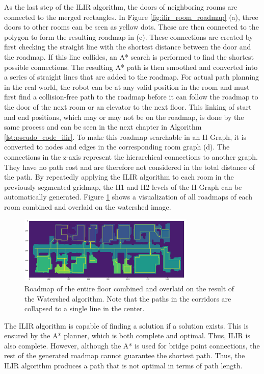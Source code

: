 As the last step of the ILIR algorithm, the doors of neighboring rooms are connected to the merged rectangles. In Figure \ref{fig:ilir_room_roadmap} (a), three doors to other rooms can be seen as yellow dots. These are then connected to the polygon to form the resulting roadmap in (c). These connections are created by first checking the straight line with the shortest distance between the door and the roadmap. If this line collides, an A* search is performed to find the shortest possible connections. The resulting A* path is then smoothed and converted into a series of straight lines that are added to the roadmap. For actual path planning in the real world, the robot can be at any valid position in the room and must first find a collision-free path to the roadmap before it can follow the roadmap to the door of the next room or an elevator to the next floor. This linking of start and end positions, which may or may not be on the roadmap, is done by the same process and can be seen in the next chapter in Algorithm \ref{lst:pseudo_code_ilir}. To make this roadmap searchable in an H-Graph, it is converted to nodes and edges in the corresponding room graph (d). The connections in the z-axis represent the hierarchical connections to another graph. They have no path cost and are therefore not considered in the total distance of the path. By repeatedly applying the ILIR algorithm to each room in the previously segmented gridmap, the H1 and H2 levels of the H-Graph can be automatically generated. Figure \ref{fig:ryu_roadmap} shows a visualization of all roadmaps of each room combined and overlaid on the watershed image.

\begin{figure}[h]
    \centering
    \includegraphics[width=0.75\textwidth]{figures/50_implementation/ryu_roadmap.png}
    \caption[Roadmap of the entire floor combined]{Roadmap of the entire floor combined and overlaid on the result of the Watershed algorithm. Note that the paths in the corridors are collapsed to a single line in the center.}
    \label{fig:ryu_roadmap}
\end{figure}

The ILIR algorithm is capable of finding a solution if a solution exists. This is ensured by the A* planner, which is both complete and optimal. Thus, ILIR is also complete. However, although the A* is used for bridge point connections, the rest of the generated roadmap cannot guarantee the shortest path. Thus, the ILIR algorithm produces a path that is not optimal in terms of path length.

